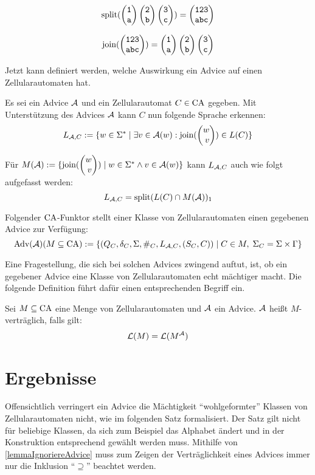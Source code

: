 \begin{exmp}
    \[
        \splitw(\Spvek{\chr{1}; \chr{a}}\Spvek{\chr{2}; \chr{b}}\Spvek{\chr{3}; \chr{c}}) = \Spvek{\chr{123}; \chr{abc}}
    \]
    
    \[
        \joinw(\Spvek{\chr{123}; \chr{abc}}) = \Spvek{\chr{1}; \chr{a}}\Spvek{\chr{2}; \chr{b}}\Spvek{\chr{3}; \chr{c}}
    \]        
\end{exmp}

Jetzt kann definiert werden, welche Auswirkung ein Advice auf einen Zellularautomaten hat.

\begin{definition}
    Es sei ein Advice $\mathcal{A}$ und ein Zellularautomat $C \in \textrm{CA}$ gegeben.
    Mit Unterstützung des Advices $\mathcal{A}$ kann $C$ nun folgende Sprache erkennen:
    \[
         L_{\advA, C} := \set{ w \in \Sigma^*}{\exists v \in \advA(w): \joinw(\Spvek{w; v}) \in L(C)}
    \]
    
    Für $M(\advA) := \set{ \joinw(\Spvek{ w; v}) }
        { w \in \Sigma^* \land v \in \advA(w) }$
    kann $L_{\mathcal{A}, C}$ auch wie folgt aufgefasst werden:
    \[
        L_{\mathcal{A}, C} = \textrm{split}(
            L(C) \cap M(\mathcal{A})
        )_1
    \]
    
    Folgender $\textrm{CA}$-Funktor stellt einer Klasse von Zellularautomaten einen gegebenen Advice zur Verfügung:
    \[
        \textrm{Adv}(\mathcal{A})(M \subseteq \textrm{CA}) :=
            \{ { (Q_C, \delta_C, \Sigma, \#_C, L_{\mathcal{A}, C}, (S_C, C))} \; | \; { C \in M, \; \Sigma_C = \Sigma \times \Gamma } \}
    \]
\end{definition}

Eine Fragestellung, die sich bei solchen Advices zwingend auftut, ist, ob ein gegebener Advice eine Klasse von Zellularautomaten echt mächtiger macht.
Die folgende Definition führt dafür einen entsprechenden Begriff ein.

\begin{definition}
    Sei $M \subseteq \textrm{CA}$ eine Menge von Zellularautomaten und $\mathcal{A}$ ein Advice.
    $\mathcal{A}$ heißt $M$-verträglich, falls gilt:
    \[
        \mathcal{L}(M) = \mathcal{L}(M^{\mathcal{A}})
    \]
\end{definition}

\section{Ergebnisse}

Offensichtlich verringert ein Advice die Mächtigkeit \enquote{wohlgeformter} Klassen von Zellularautomaten nicht, wie im folgenden Satz formalisiert. Der Satz gilt nicht für beliebige Klassen, da sich zum Beispiel das Alphabet ändert und in der Konstruktion entsprechend gewählt werden muss. Mithilfe von \cref{lemmaIgnoriereAdvice} muss zum Zeigen der Verträglichkeit eines Advices immer nur die Inklusion \enquote{$\supseteq$} beachtet werden.

